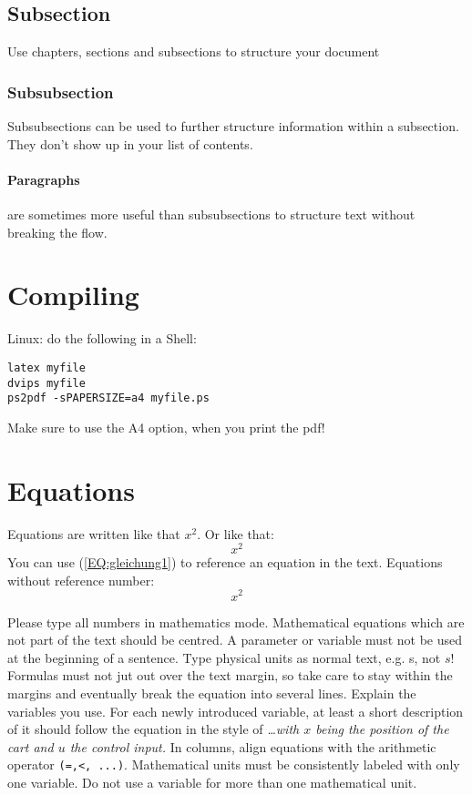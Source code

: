 \documentclass[a4paper,twoside, openright,12pt]{report}
\begin{document}
\subsection{Subsection}

Use chapters, sections and subsections to structure your document

\subsubsection{Subsubsection}

Subsubsections can be used to further structure information within a subsection. They don't show up in your list of contents.

\paragraph{Paragraphs} are sometimes more useful than subsubsections to structure text without breaking the flow.

\section{Compiling}
Linux: 
do the following in a Shell:\\
\begin{verbatim}
latex myfile
dvips myfile
ps2pdf -sPAPERSIZE=a4 myfile.ps
\end{verbatim}
Make sure to use the A4 option, when you print the pdf!

\section{Equations}
Equations are written like that $x^2$. Or like that:
\begin{equation}
x^2
\label{EQ:gleichung1}
\end{equation}
You can use (\ref{EQ:gleichung1}) to reference an equation in the
text. Equations without reference number:
\[
x^2
\]

Please type all numbers in mathematics mode.
Mathematical equations which are not part of the text should be centred.
A parameter or variable must not be used at the beginning of a sentence.
Type physical units as normal text, e.g. s, not $s$!
Formulas must not jut out over the text margin, so take care to stay within the margins and eventually break the equation into several lines.
Explain the variables you use. For each newly introduced variable, at least a short description of it should follow the equation in the style of \emph{\ldots with $x$ being the position of the cart and $u$ the control input.}
In columns, align equations with the arithmetic operator \verb|(=,<, ...)|.
Mathematical units must be consistently labeled with only one variable. Do not
use a variable for more than one mathematical unit.
\end{document}
